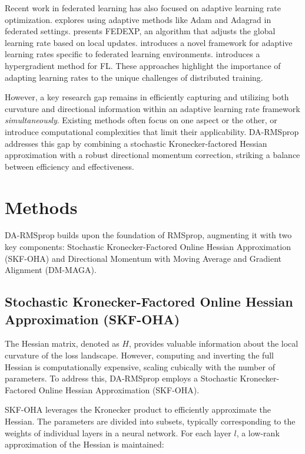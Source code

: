 \documentclass[a4paper,11pt]{article}
\begin{document}
Recent work in federated learning has also focused on adaptive learning rate optimization. \citep{reddi2020adaptive} explores using adaptive methods like Adam and Adagrad in federated settings. \citep{jhunjhunwala2023fedexp} presents FEDEXP, an algorithm that adjusts the global learning rate based on local updates. \citep{wang2020tackling} introduces a novel framework for adaptive learning rates specific to federated learning environments. \citep{li2023fedhyper} introduces a hypergradient method for FL. These approaches highlight the importance of adapting learning rates to the unique challenges of distributed training.

However, a key research gap remains in efficiently capturing and utilizing both curvature and directional information within an adaptive learning rate framework \textit{simultaneously}. Existing methods often focus on one aspect or the other, or introduce computational complexities that limit their applicability. DA-RMSprop addresses this gap by combining a stochastic Kronecker-factored Hessian approximation with a robust directional momentum correction, striking a balance between efficiency and effectiveness.

\section{Methods}

DA-RMSprop builds upon the foundation of RMSprop, augmenting it with two key components: Stochastic Kronecker-Factored Online Hessian Approximation (SKF-OHA) and Directional Momentum with Moving Average and Gradient Alignment (DM-MAGA).

\subsection{Stochastic Kronecker-Factored Online Hessian Approximation (SKF-OHA)}

The Hessian matrix, denoted as \(H\), provides valuable information about the local curvature of the loss landscape. However, computing and inverting the full Hessian is computationally expensive, scaling cubically with the number of parameters. To address this, DA-RMSprop employs a Stochastic Kronecker-Factored Online Hessian Approximation (SKF-OHA).

SKF-OHA leverages the Kronecker product to efficiently approximate the Hessian. The parameters are divided into subsets, typically corresponding to the weights of individual layers in a neural network. For each layer \(l\), a low-rank approximation of the Hessian is maintained:
\end{document}
